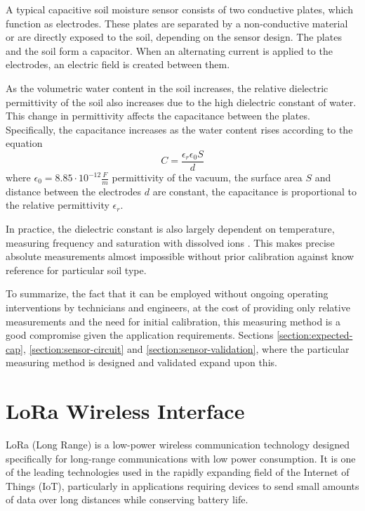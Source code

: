 A typical capacitive soil moisture sensor consists of two conductive plates, which function as electrodes. These plates are separated by a non-conductive material or are directly exposed to the soil, depending on the sensor design. The plates and the soil form a capacitor. When an alternating current is applied to the electrodes, an electric field is created between them.

As the volumetric water content in the soil increases, the relative dielectric permittivity of the soil also increases due to the high dielectric constant of water. This change in permittivity affects the capacitance between the plates. Specifically, the capacitance increases as the water content rises according to the equation
\begin{equation}
    \label{equation:capacitance} C = \dfrac{\epsilon_r \epsilon_0 S}{d}
\end{equation}
where $\epsilon_0 = 8.85 \cdot 10^{-12} \frac{F}{m}$ permittivity of the vacuum, the surface area $S$ and distance between the electrodes $d$ are constant, the capacitance is proportional to the relative permittivity $\epsilon_r$.

In practice, the dielectric constant is also largely dependent on temperature, measuring frequency and saturation with dissolved ions \cite{meter_group_soil_2023,podest_applications_nodate}. This makes precise absolute measurements almost impossible without prior calibration against know reference for particular soil type.

To summarize, the fact that it can be employed without ongoing operating interventions by technicians and engineers, at the cost of providing only relative measurements and the need for initial calibration, this measuring method is a good compromise given the application requirements. Sections \ref{section:expected-cap}, \ref{section:sensor-circuit} and \ref{section:sensor-validation}, where the particular measuring method is designed and validated expand upon this.

\section{LoRa Wireless Interface}
LoRa (Long Range) is a low-power wireless communication technology designed specifically for long-range communications with low power consumption. It is one of the leading technologies used in the rapidly expanding field of the Internet of Things (IoT), particularly in applications requiring devices to send small amounts of data over long distances while conserving battery life.

